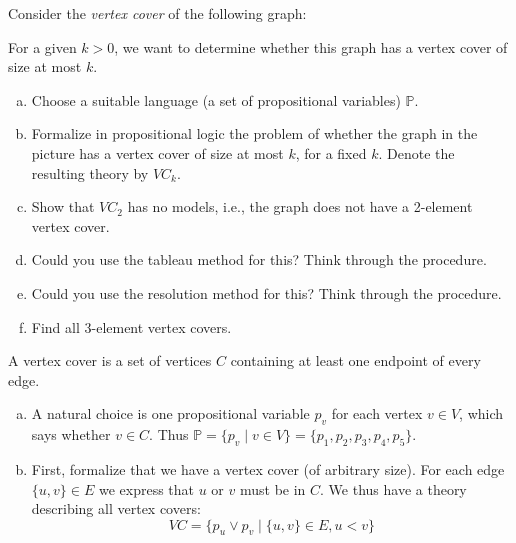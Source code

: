 \begin{problem}

    Consider the \emph{vertex cover} of the following graph:    
    \begin{center}
    \end{center}
    For a given $k>0$, we want to determine whether this graph has a vertex cover of size at most $k$.

    \begin{enumerate}[(a)]
        \item Choose a suitable language (a set of propositional variables) $\mathbb P$.
        \item Formalize in propositional logic the problem of whether the graph in the picture has a vertex cover of size at most $k$, for a fixed $k$. Denote the resulting theory by ${VC}_k$.
        \item Show that ${VC}_2$ has no models, i.e., the graph does not have a 2-element vertex cover.
        \item Could you use the tableau method for this? Think through the procedure.
        \item Could you use the resolution method for this? Think through the procedure.
        \item Find all 3-element vertex covers.            
    \end{enumerate}

    \begin{solution}
        A vertex cover is a set of vertices $C$ containing at least one endpoint of every edge.
        \begin{enumerate}[(a)]
            \item A natural choice is one propositional variable $p_v$ for each vertex $v\in V$, which says whether $v\in C$. Thus $\mathbb P=\{p_v\mid v\in V\}=\{p_1,p_2,p_3,p_4,p_5\}$.
            \item First, formalize that we have a vertex cover (of arbitrary size). For each edge $\{u,v\}\in E$ we express that $u$ or $v$ must be in $C$. We thus have a theory describing all vertex covers:
            $$
            VC=\{p_u\lor p_v\mid \{u,v\}\in E, u<v\}
            $$
            

\end{enumerate}
\end{solution}
\end{problem}
